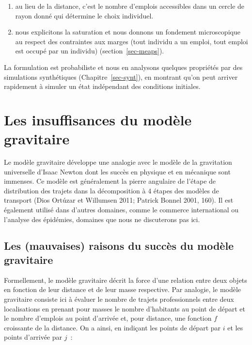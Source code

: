 \documentclass[
  10pt,
  a4paper,
  numbers=noendperiod,
  DIV=9]{scrreprt}
\begin{document}
\begin{enumerate}
\def\labelenumi{\arabic{enumi}.}
\item
  au lieu de la distance, c'est le nombre d'emplois accessibles dans un
  cercle de rayon donné qui détermine le choix individuel.
\item
  nous explicitons la saturation et nous donnons un fondement
  microscopique au respect des contraintes aux marges (tout individu a
  un emploi, tout emploi est occupé par un individu)
  (section~\ref{sec-meaps}).
\end{enumerate}

La formulation est probabiliste et nous en analysons quelques propriétés
par des simulations synthétiques (Chapitre~\ref{sec-synt}), en montrant
qu'on peut arriver rapidement à simuler un état indépendant des
conditions initiales.

\hypertarget{sec-grav}{%
\section{Les insuffisances du modèle gravitaire}\label{sec-grav}}

Le modèle gravitaire développe une analogie avec le modèle de la
gravitation universelle d'Isaac Newton dont les succès en physique et en
mécanique sont immenses. Ce modèle est généralement la pierre angulaire
de l'étape de distribution des trajets dans la décomposition à 4 étapes
des modèles de transport (Dios Ortúzar et Willumsen 2011; Patrick Bonnel
2001, 160). Il est également utilisé dans d'autres domaines, comme le
commerce international ou l'analyse des épidémies, domaines que nous ne
discuterons pas ici.

\hypertarget{les-mauvaises-raisons-du-succuxe8s-du-moduxe8le-gravitaire}{%
\subsection{Les (mauvaises) raisons du succès du modèle
gravitaire}\label{les-mauvaises-raisons-du-succuxe8s-du-moduxe8le-gravitaire}}

Formellement, le modèle gravitaire décrit la force d'une relation entre
deux objets en fonction de leur distance et de leur masse respective.
Par analogie, le modèle gravitaire consiste ici à évaluer le nombre de
trajets professionnels entre deux localisations en prenant pour masses
le nombre d'habitants au point de départ et le nombre d'emplois au point
d'arrivée et, pour distance, une fonction \(f\) croissante de la
distance. On a ainsi, en indiçant les points de départ par \(i\) et les
points d'arrivée par \(j\)~:
\end{document}
